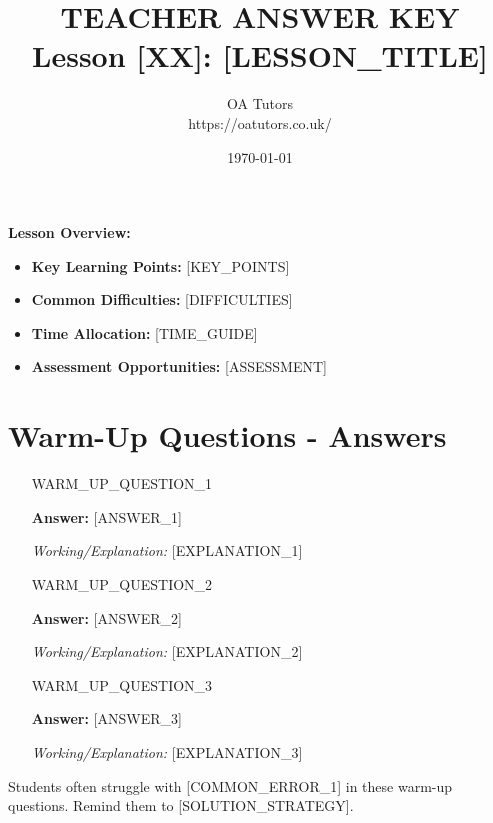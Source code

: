 \documentclass[a4paper,12pt]{article}
\begin{document}
\title{\textcolor{oared}{\Huge TEACHER ANSWER KEY} \\ 
       \textcolor{oablue}{\Large Lesson [XX]: [LESSON_TITLE]}}
\author{\textcolor{oablue}{OA Tutors} \\ 
        \textcolor{oagray}{https://oatutors.co.uk/}}
\date{\textcolor{oagray}{\today}}

\maketitle

\begin{teachingtip}
\textbf{Lesson Overview:}
\begin{itemize}
    \item \textbf{Key Learning Points:} [KEY_POINTS]
    \item \textbf{Common Difficulties:} [DIFFICULTIES]
    \item \textbf{Time Allocation:} [TIME_GUIDE]
    \item \textbf{Assessment Opportunities:} [ASSESSMENT]
\end{itemize}
\end{teachingtip}

\section{Warm-Up Questions - Answers}

\begin{enumerate}
    \item [WARM_UP_QUESTION_1]
    
    \textcolor{oared}{\textbf{Answer:} [ANSWER_1]}
    
    \textit{Working/Explanation:} [EXPLANATION_1]
    
    \item [WARM_UP_QUESTION_2]
    
    \textcolor{oared}{\textbf{Answer:} [ANSWER_2]}
    
    \textit{Working/Explanation:} [EXPLANATION_2]
    
    \item [WARM_UP_QUESTION_3]
    
    \textcolor{oared}{\textbf{Answer:} [ANSWER_3]}
    
    \textit{Working/Explanation:} [EXPLANATION_3]
\end{enumerate}

\begin{commonerror}
Students often struggle with [COMMON_ERROR_1] in these warm-up questions. 
Remind them to [SOLUTION_STRATEGY].
\end{commonerror}
\end{document}
